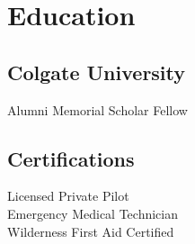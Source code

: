 \documentclass[letterpaper]{deedy-resume} %
\begin{document}
\begin{minipage}[t]{0.33\textwidth}
\section{Education} 

\subsection{Colgate University}

Alumni Memorial Scholar Fellow \\

\sectionspace %


\subsection{Certifications}

Licensed Private Pilot \\ 
Emergency Medical Technician \\ 
Wilderness First Aid Certified \\

\sectionspace %








\end{minipage}
\end{document}
